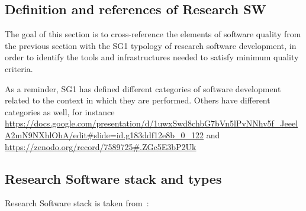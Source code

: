 \subsection{Definition and references of Research SW}


The goal of this section is to cross-reference the elements of
software quality from the previous section with the SG1 typology of
research software development, in order to identify the tools and
infrastructures needed to satisfy minimum quality criteria. 


As a reminder, SG1 has defined different categories of software
development related to the context in which they are performed. Others have different categories as well, for instance \url{https://docs.google.com/presentation/d/1uwxSwd8chbG7bVn5lPvNNhv5f_JeeelA2mN9NXhlOhA/edit#slide=id.g183ddf12e8b_0_122} and \url{https://zenodo.org/record/7589725#.ZGc5E3bP2Uk}

\subsection{Research Software stack and types}

Research Software stack is taken from~\cite{hinsen2019}:

